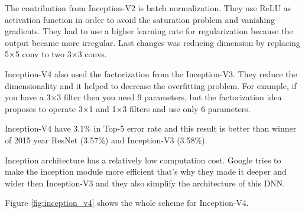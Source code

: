 \documentclass[titlepage]{report}
\begin{document}
The contribution from Inception-V2 is batch normalization. They use ReLU as activation function in order to avoid the saturation problem and vanishing gradients. They had to use a higher learning rate for regularization because the output became more irregular. Last changes was reducing dimension by replacing   5×5 conv to two 3×3 convs. 

Inception-V4 also used the factorization from the Inception-V3. They reduce the dimensionality and it helped to decrease the overfitting problem. For example, if you have a 3×3 filter then you need 9 parameters, but the factorization idea proposes to operate  3×1 and  1×3 filters and use only 6 parameters. 

Inception-V4 have 3.1\% in Top-5 error rate and this result is better than winner of 2015 year ResNet (3.57\%) and  Inception-V3 (3.58\%). 

Inception architecture has a relatively low computation cost. Google tries to make the inception module more efficient that's why they made it deeper and wider then Inception-V3 and they also simplify the architecture of this DNN.

Figure \ref{fig:inception_v4} shows the whole scheme for Inception-V4.
\end{document}
